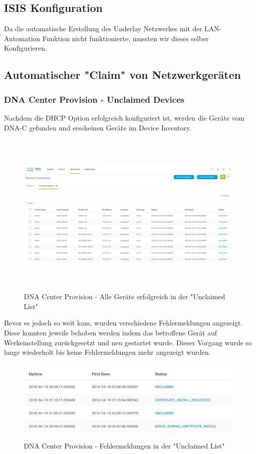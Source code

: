 \subsection{ISIS Konfiguration}
Da die automatische Erstellung des Underlay Netzwerkes mit der LAN-Automation Funktion nicht funktionierte, mussten wir dieses selber Konfigurieren. 

\subsection{Automatischer "Claim" von Netzwerkgeräten}

\subsubsection{DNA Center Provision - Unclaimed Devices}

Nachdem die DHCP Option erfolgreich konfiguriert ist, werden die Geräte vom DNA-C gefunden und erscheinen Geräte im Device Inventory.

\begin{figure}[H]
	\centering
	\includegraphics[height=8cm]{img/DNA_Center_All_Fabric2_Unclaimed.PNG}
	\caption{DNA Center Provision - Alle Geräte erfolgreich in der "Unclaimed List"}
	\label{fig:dna-center-provision-unclaimed}
\end{figure}

Bevor es jedoch so weit kam, wurden verschiedene Fehlermeldungen angezeigt. Diese konnten jeweils behoben werden indem das betroffene Gerät auf Werkeinstellung zurückgesetzt und neu gestartet wurde. Dieser Vorgang wurde so lange wiederholt bis keine Fehlermeldungen mehr angezeigt wurden. 

\begin{figure}[H]
	\centering
	\includegraphics[height=4cm]{img/DNA_Center_Unclaimed_Errors_1.PNG}
	\caption{DNA Center Provision - Fehlermeldungen in der "Unclaimed List"}
	\label{fig:dna-center-provision-unclaimed-2}
\end{figure}

